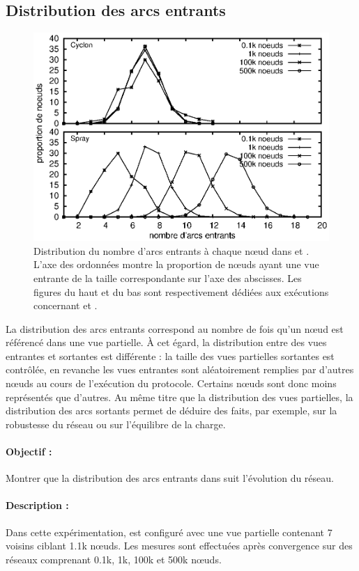 \subsection{Distribution des arcs entrants}
\label{net:subsec:inview}

\begin{figure}
  \centering
  \includegraphics[width=.8\textwidth]{img/spray/histo.eps}
  \caption[Distribution du nombre d'arcs entrants]{\label{net:fig:inview}
    Distribution du nombre d'arcs entrants à chaque nœud dans \CYCLON et
    \SPRAY. L'axe des ordonnées montre la proportion de nœuds ayant une vue
    entrante de la taille correspondante sur l'axe des abscisses. Les figures du
    haut et du bas sont respectivement dédiées aux exécutions concernant \CYCLON
    et \SPRAY.}
\end{figure}

La distribution des arcs entrants correspond au nombre de fois qu'un nœud est
référencé dans une vue partielle. À cet égard, la distribution entre des vues
entrantes et sortantes est différente : la taille des vues partielles sortantes
est contrôlée, en revanche les vues entrantes sont aléatoirement remplies par
d'autres nœuds au cours de l'exécution du protocole. Certains nœuds sont donc
moins représentés que d'autres.  Au même titre que la distribution des vues
partielles, la distribution des arcs sortants permet de déduire des faits, par
exemple, sur la robustesse du réseau ou sur l'équilibre de la charge.

\paragraph{Objectif :} Montrer que la distribution des arcs entrants dans \SPRAY
suit l'évolution du réseau.

\paragraph{Description :} Dans cette expérimentation, \CYCLON est configuré avec
une vue partielle contenant 7 voisins ciblant 1.1k nœuds. Les mesures sont
effectuées après convergence sur des réseaux comprenant 0.1k, 1k, 100k et 500k
nœuds.

